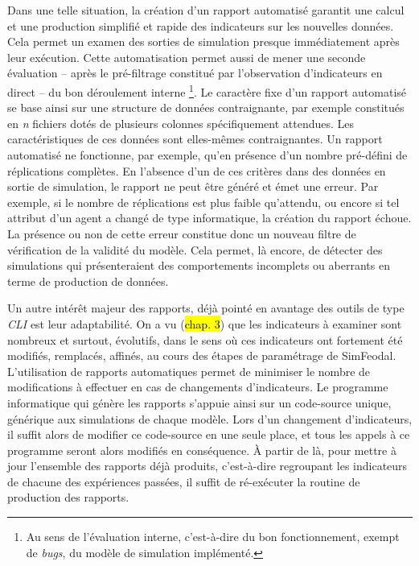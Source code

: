 	Dans une telle situation, la création d'un rapport automatisé garantit une calcul et une production simplifié et rapide des indicateurs sur les nouvelles données.
	Cela permet un examen des sorties de simulation presque immédiatement après leur exécution.
	Cette automatisation permet aussi de mener une seconde évaluation -- après le pré-filtrage constitué par l'observation d'indicateurs en direct -- du bon déroulement \og interne \fg{}\footnote{
		Au sens de l'évaluation interne, c'est-à-dire du bon fonctionnement, exempt de \textit{bugs}, du modèle de simulation implémenté.
	}.
	Le caractère fixe d'un rapport automatisé se base ainsi sur une structure de données contraignante, par exemple constitués en \textit{n} fichiers dotés de plusieurs colonnes spécifiquement attendues.
	Les caractéristiques de ces données sont elles-mêmes contraignantes.
	Un rapport automatisé ne fonctionne, par exemple, qu'en présence d'un nombre pré-défini de réplications complètes.
	En l'absence d'un de ces critères dans des données en sortie de simulation, le rapport ne peut être généré et émet une erreur.
	Par exemple, si le nombre de réplications est plus faible qu'attendu, ou encore si tel attribut d'un agent a changé de type informatique, la création du rapport échoue.
	La présence ou non de cette erreur constitue donc un nouveau filtre de vérification de la validité du modèle.
	Cela permet, là encore, de détecter des simulations qui présenteraient des comportements incomplets ou aberrants en terme de production de données.

	Un autre intérêt majeur des rapports, déjà pointé en avantage des outils de type \textit{CLI} est leur adaptabilité.
	On a vu (\hl{chap. 3}) que les indicateurs à examiner sont nombreux et surtout, évolutifs, dans le sens où ces indicateurs ont fortement été modifiés, remplacés, affinés, au cours des étapes de paramétrage de SimFeodal.
	L'utilisation de rapports automatiques permet de minimiser le nombre de modifications à effectuer en cas de changements d'indicateurs.
	Le programme informatique qui génère les rapports s'appuie ainsi sur un code-source unique, générique aux simulations de chaque modèle.
	Lors d'un changement d'indicateurs, il suffit alors de modifier ce code-source en une seule place, et tous les appels à ce programme seront alors modifiés en conséquence.
	À partir de là, pour mettre à jour l'ensemble des rapports déjà produits, c'est-à-dire regroupant les indicateurs de chacune des expériences passées, il suffit de ré-exécuter la routine de production des rapports.
	
